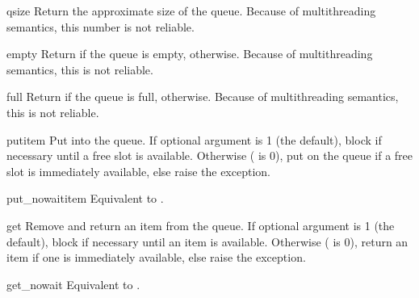 \begin{methoddesc}{qsize}{}
Return the approximate size of the queue.  Because of multithreading
semantics, this number is not reliable.
\end{methoddesc}

\begin{methoddesc}{empty}{}
Return  if the queue is empty,  otherwise.  Because
of multithreading semantics, this is not reliable.
\end{methoddesc}

\begin{methoddesc}{full}{}
Return  if the queue is full,  otherwise.  Because of
multithreading semantics, this is not reliable.
\end{methoddesc}

\begin{methoddesc}{put}{item}
Put  into the queue.  If optional argument  is 1
(the default), block if necessary until a free slot is available.
Otherwise ( is 0), put  on the queue if a free
slot is immediately available, else raise the 
exception.
\end{methoddesc}

\begin{methoddesc}{put_nowait}{item}
Equivalent to .
\end{methoddesc}

\begin{methoddesc}{get}{}
Remove and return an item from the queue.  If optional argument
 is 1 (the default), block if necessary until an item is
available.  Otherwise ( is 0), return an item if one is
immediately available, else raise the
 exception.
\end{methoddesc}

\begin{methoddesc}{get_nowait}{}
Equivalent to .
\end{methoddesc}
